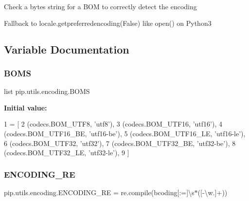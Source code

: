 \begin{DoxyVerb}Check a bytes string for a BOM to correctly detect the encoding

Fallback to locale.getpreferredencoding(False) like open() on Python3\end{DoxyVerb}
 

\subsection{Variable Documentation}
\mbox{\label{namespacepip_1_1utils_1_1encoding_adb154be984065fe2c170a89d7dda7deb}} 
\subsubsection{\texorpdfstring{B\+O\+MS}{BOMS}}
{\footnotesize\ttfamily list pip.\+utils.\+encoding.\+B\+O\+MS}

{\bfseries Initial value\+:}
\begin{DoxyCode}
1 =  [
2     (codecs.BOM\_UTF8, \textcolor{stringliteral}{'utf8'}),
3     (codecs.BOM\_UTF16, \textcolor{stringliteral}{'utf16'}),
4     (codecs.BOM\_UTF16\_BE, \textcolor{stringliteral}{'utf16-be'}),
5     (codecs.BOM\_UTF16\_LE, \textcolor{stringliteral}{'utf16-le'}),
6     (codecs.BOM\_UTF32, \textcolor{stringliteral}{'utf32'}),
7     (codecs.BOM\_UTF32\_BE, \textcolor{stringliteral}{'utf32-be'}),
8     (codecs.BOM\_UTF32\_LE, \textcolor{stringliteral}{'utf32-le'}),
9 ]
\end{DoxyCode}
\mbox{\label{namespacepip_1_1utils_1_1encoding_abb3bbfc7c97f461b48cff8119aea35a3}} 
\subsubsection{\texorpdfstring{E\+N\+C\+O\+D\+I\+N\+G\+\_\+\+RE}{ENCODING\_RE}}
{\footnotesize\ttfamily pip.\+utils.\+encoding.\+E\+N\+C\+O\+D\+I\+N\+G\+\_\+\+RE = re.\+compile(b\textquotesingle{}coding\mbox{[}\+:=\mbox{]}\textbackslash{}s$\ast$(\mbox{[}-\/\textbackslash{}w.\mbox{]}+)\textquotesingle{})}

